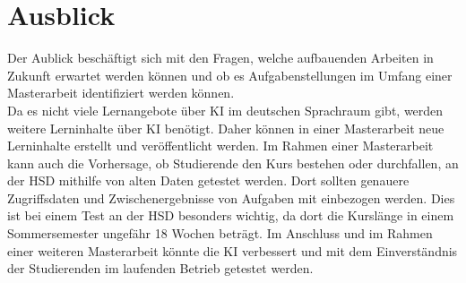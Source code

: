\chapter{Ausblick}
Der Aublick beschäftigt sich mit den Fragen, welche aufbauenden Arbeiten in Zukunft erwartet werden können und ob es Aufgabenstellungen im Umfang einer Masterarbeit identifiziert werden können.
\\ \noindent
Da es nicht viele Lernangebote über \ac{KI} im deutschen Sprachraum gibt, werden weitere Lerninhalte über \ac{KI} benötigt. Daher können in einer Masterarbeit neue Lerninhalte erstellt und veröffentlicht werden.
Im Rahmen einer Masterarbeit kann auch die Vorhersage, ob Studierende den Kurs bestehen oder durchfallen, an der HSD mithilfe von alten Daten getestet werden.
Dort sollten genauere Zugriffsdaten und Zwischenergebnisse von Aufgaben mit einbezogen werden. Dies ist bei einem Test an der HSD besonders wichtig, da dort die Kurslänge in einem Sommersemester ungefähr 18 Wochen beträgt.
Im Anschluss und im Rahmen einer weiteren Masterarbeit könnte die KI verbessert und mit dem Einverständnis der Studierenden im laufenden Betrieb getestet werden.
